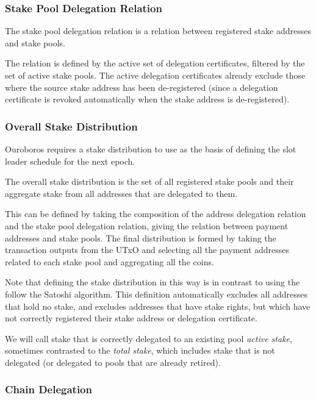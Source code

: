 \documentclass[11pt,a4paper,dvipsnames,twosided]{article}
\newcommand{\citep}[1]{\cite{#1}}
\begin{document}
\subsubsection{Stake Pool Delegation Relation}
\label{stake-pool-delegation-relation}

The stake pool delegation relation is a relation between registered stake
addresses and stake pools.

The relation is defined by the active set of delegation certificates,
filtered by the set of active stake pools. The active delegation
certificates already exclude those where the source stake address has
been de-registered (since a delegation certificate is revoked automatically when
the stake address is de-registered).

\subsubsection{Overall Stake Distribution}
\label{overall-stake-distribution}

Ouroboros \citep{ouroboros_classic} requires a stake distribution to
use as the basis of defining the slot leader schedule for the next
epoch.

The overall stake distribution is the set of all registered stake pools
and their aggregate stake from all addresses that are delegated to them.

This can be defined by taking the composition of the address delegation relation
and the stake pool delegation relation, giving the relation between payment
addresses and stake pools. The final distribution is formed by taking the
transaction outputs from the UTxO and selecting all the payment addresses
related to each stake pool and aggregating all the coins.

Note that defining the stake distribution in this way is in contrast to using
the follow the Satoshi algorithm. This definition automatically excludes all
addresses that hold no stake, and excludes addresses that have stake rights, but
which have not correctly registered their stake address or delegation
certificate.

We will call stake that is correctly delegated to an existing pool \emph{active
  stake}, sometimes contrasted to the \emph{total stake}, which includes stake
that is not delegated (or delegated to pools that are already retired).

\subsubsection{Chain Delegation}
\label{chain-delegation}
\end{document}
